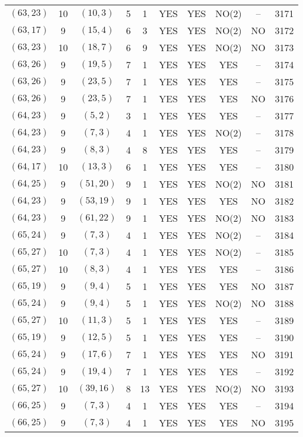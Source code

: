 \begin{longtable}{|c|c|c|c|c|c|c|c|c|c|}
$(63, 23)$ & 10 & $(10, 3)$ & 5 & 1 & YES & YES & NO(2) & -- & 3171\\
$(63, 17)$ & 9 & $(15, 4)$ & 6 & 3 & YES & YES & NO(2) & NO & 3172\\
$(63, 23)$ & 10 & $(18, 7)$ & 6 & 9 & YES & YES & NO(2) & NO & 3173\\
$(63, 26)$ & 9 & $(19, 5)$ & 7 & 1 & YES & YES & YES & -- & 3174\\
$(63, 26)$ & 9 & $(23, 5)$ & 7 & 1 & YES & YES & YES & -- & 3175\\
$(63, 26)$ & 9 & $(23, 5)$ & 7 & 1 & YES & YES & YES & NO & 3176\\
$(64, 23)$ & 9 & $(5, 2)$ & 3 & 1 & YES & YES & YES & -- & 3177\\
$(64, 23)$ & 9 & $(7, 3)$ & 4 & 1 & YES & YES & NO(2) & -- & 3178\\
$(64, 23)$ & 9 & $(8, 3)$ & 4 & 8 & YES & YES & YES & -- & 3179\\
$(64, 17)$ & 10 & $(13, 3)$ & 6 & 1 & YES & YES & YES & -- & 3180\\
$(64, 25)$ & 9 & $(51, 20)$ & 9 & 1 & YES & YES & NO(2) & NO & 3181\\
$(64, 23)$ & 9 & $(53, 19)$ & 9 & 1 & YES & YES & YES & NO & 3182\\
$(64, 23)$ & 9 & $(61, 22)$ & 9 & 1 & YES & YES & NO(2) & NO & 3183\\
$(65, 24)$ & 9 & $(7, 3)$ & 4 & 1 & YES & YES & NO(2) & -- & 3184\\
$(65, 27)$ & 10 & $(7, 3)$ & 4 & 1 & YES & YES & NO(2) & -- & 3185\\
$(65, 27)$ & 10 & $(8, 3)$ & 4 & 1 & YES & YES & YES & -- & 3186\\
$(65, 19)$ & 9 & $(9, 4)$ & 5 & 1 & YES & YES & YES & NO & 3187\\
$(65, 24)$ & 9 & $(9, 4)$ & 5 & 1 & YES & YES & NO(2) & NO & 3188\\
$(65, 27)$ & 10 & $(11, 3)$ & 5 & 1 & YES & YES & YES & -- & 3189\\
$(65, 19)$ & 9 & $(12, 5)$ & 5 & 1 & YES & YES & YES & -- & 3190\\
$(65, 24)$ & 9 & $(17, 6)$ & 7 & 1 & YES & YES & YES & NO & 3191\\
$(65, 24)$ & 9 & $(19, 4)$ & 7 & 1 & YES & YES & YES & -- & 3192\\
$(65, 27)$ & 10 & $(39, 16)$ & 8 & 13 & YES & YES & NO(2) & NO & 3193\\
$(66, 25)$ & 9 & $(7, 3)$ & 4 & 1 & YES & YES & YES & -- & 3194\\
$(66, 25)$ & 9 & $(7, 3)$ & 4 & 1 & YES & YES & YES & NO & 3195\\

\end{longtable}
